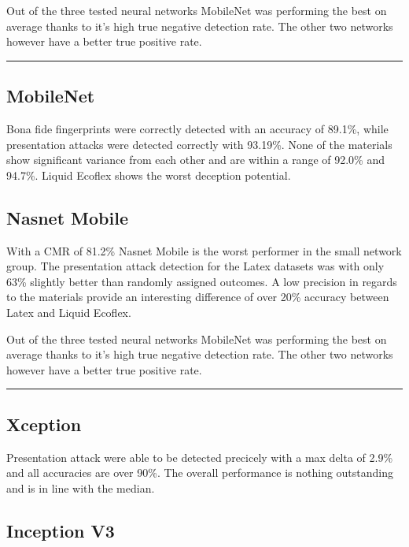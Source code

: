 \medskip
Out of the three tested neural networks MobileNet was performing the best on average thanks to it's high true negative detection rate.
The other two networks however have a better true positive rate.
\bigskip\hrule



\subsection{MobileNet}
Bona fide fingerprints were correctly detected with an accuracy of 89.1\%, while presentation attacks were detected correctly with 93.19\%.
None of the materials show significant variance from each other and are within a range of 92.0\% and 94.7\%.
Liquid Ecoflex shows the worst deception potential.






\subsection{Nasnet Mobile}

With a CMR of 81.2\% Nasnet Mobile is the worst performer in the small network group.
The presentation attack detection for the Latex datasets was with only 63\% slightly better than randomly assigned outcomes.
A low precision in regards to the materials provide an interesting difference of over 20\% accuracy between Latex and Liquid Ecoflex.



\medskip
Out of the three tested neural networks MobileNet was performing the best on average thanks to it's high true negative detection rate.
The other two networks however have a better true positive rate.
\bigskip\hrule



\subsection{Xception}
    Presentation attack were able to be detected precicely with a max delta of 2.9\% and all accuracies are over 90\%.
    The overall performance is nothing outstanding and is in line with the median.




\subsection{Inception V3}

